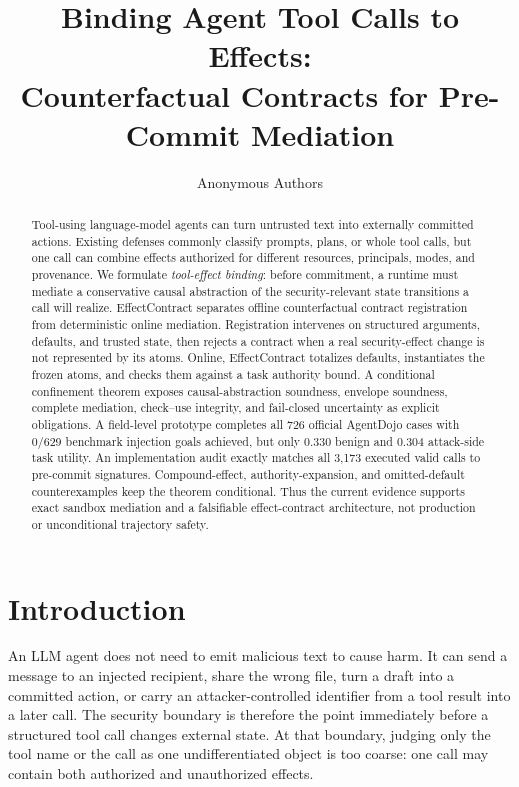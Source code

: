 \documentclass[letterpaper,twocolumn,10pt]{article}
\title{Binding Agent Tool Calls to Effects:\\ Counterfactual Contracts for Pre-Commit Mediation}
\author{Anonymous Authors}
\date{}
\newcommand{\sys}{EffectContract}
\begin{document}
\maketitle
\begin{abstract}
Tool-using language-model agents can turn untrusted text into externally committed actions. Existing defenses commonly classify prompts, plans, or whole tool calls, but one call can combine effects authorized for different resources, principals, modes, and provenance. We formulate \emph{tool-effect binding}: before commitment, a runtime must mediate a conservative causal abstraction of the security-relevant state transitions a call will realize. \sys{} separates offline counterfactual contract registration from deterministic online mediation. Registration intervenes on structured arguments, defaults, and trusted state, then rejects a contract when a real security-effect change is not represented by its atoms. Online, \sys{} totalizes defaults, instantiates the frozen atoms, and checks them against a task authority bound. A conditional confinement theorem exposes causal-abstraction soundness, envelope soundness, complete mediation, check--use integrity, and fail-closed uncertainty as explicit obligations. A field-level prototype completes all 726 official AgentDojo cases with 0/629 benchmark injection goals achieved, but only 0.330 benign and 0.304 attack-side task utility. An implementation audit exactly matches all 3,173 executed valid calls to pre-commit signatures. Compound-effect, authority-expansion, and omitted-default counterexamples keep the theorem conditional. Thus the current evidence supports exact sandbox mediation and a falsifiable effect-contract architecture, not production or unconditional trajectory safety.
\end{abstract}
 \section{Introduction}

An LLM agent does not need to emit malicious text to cause harm. It can send a message to an injected recipient, share the wrong file, turn a draft into a committed action, or carry an attacker-controlled identifier from a tool result into a later call. The security boundary is therefore the point immediately before a structured tool call changes external state. At that boundary, judging only the tool name or the call as one undifferentiated object is too coarse: one call may contain both authorized and unauthorized effects.
\end{document}
